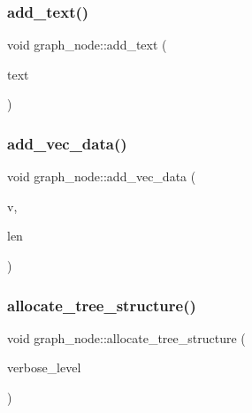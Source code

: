 \mbox{\label{classgraph__node_af21adc4e54d53c060db9470669ca8e3f}} 
\subsubsection{\texorpdfstring{add\+\_\+text()}{add\_text()}}
{\footnotesize\ttfamily void graph\+\_\+node\+::add\+\_\+text (\begin{DoxyParamCaption}\item[{const \mbox{\hyperlink{galois_8h_ab6cc7b4aeb6ea31aba2b3fbfc83ff5e6}{B\+Y\+TE}} $\ast$}]{text }\end{DoxyParamCaption})}

\mbox{\label{classgraph__node_a782ccbf13765e1c11d28da219f668d32}} 
\subsubsection{\texorpdfstring{add\+\_\+vec\+\_\+data()}{add\_vec\_data()}}
{\footnotesize\ttfamily void graph\+\_\+node\+::add\+\_\+vec\+\_\+data (\begin{DoxyParamCaption}\item[{\mbox{\hyperlink{galois_8h_a09fddde158a3a20bd2dcadb609de11dc}{I\+NT}} $\ast$}]{v,  }\item[{\mbox{\hyperlink{galois_8h_a09fddde158a3a20bd2dcadb609de11dc}{I\+NT}}}]{len }\end{DoxyParamCaption})}

\mbox{\label{classgraph__node_a88e719c26e918b93e82fc7c4f4f87243}} 
\subsubsection{\texorpdfstring{allocate\+\_\+tree\+\_\+structure()}{allocate\_tree\_structure()}}
{\footnotesize\ttfamily void graph\+\_\+node\+::allocate\+\_\+tree\+\_\+structure (\begin{DoxyParamCaption}\item[{\mbox{\hyperlink{galois_8h_a09fddde158a3a20bd2dcadb609de11dc}{I\+NT}}}]{verbose\+\_\+level }\end{DoxyParamCaption})}

